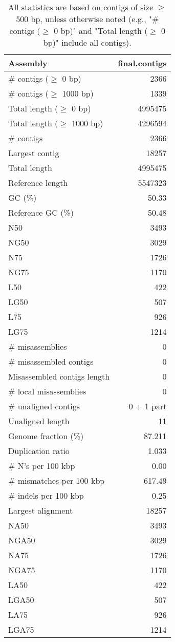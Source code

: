 \documentclass[12pt,a4paper]{article}
\begin{document}
\begin{table}[ht]
\begin{center}
\caption{All statistics are based on contigs of size $\geq$ 500 bp, unless otherwise noted (e.g., "\# contigs ($\geq$ 0 bp)" and "Total length ($\geq$ 0 bp)" include all contigs).}
\begin{tabular}{|l*{1}{|r}|}
\hline
Assembly & final.contigs \\ \hline
\# contigs ($\geq$ 0 bp) & 2366 \\ \hline
\# contigs ($\geq$ 1000 bp) & 1339 \\ \hline
Total length ($\geq$ 0 bp) & 4995475 \\ \hline
Total length ($\geq$ 1000 bp) & 4296594 \\ \hline
\# contigs & 2366 \\ \hline
Largest contig & 18257 \\ \hline
Total length & 4995475 \\ \hline
Reference length & 5547323 \\ \hline
GC (\%) & 50.33 \\ \hline
Reference GC (\%) & 50.48 \\ \hline
N50 & 3493 \\ \hline
NG50 & 3029 \\ \hline
N75 & 1726 \\ \hline
NG75 & 1170 \\ \hline
L50 & 422 \\ \hline
LG50 & 507 \\ \hline
L75 & 926 \\ \hline
LG75 & 1214 \\ \hline
\# misassemblies & 0 \\ \hline
\# misassembled contigs & 0 \\ \hline
Misassembled contigs length & 0 \\ \hline
\# local misassemblies & 0 \\ \hline
\# unaligned contigs & 0 + 1 part \\ \hline
Unaligned length & 11 \\ \hline
Genome fraction (\%) & 87.211 \\ \hline
Duplication ratio & 1.033 \\ \hline
\# N's per 100 kbp & 0.00 \\ \hline
\# mismatches per 100 kbp & 617.49 \\ \hline
\# indels per 100 kbp & 0.25 \\ \hline
Largest alignment & 18257 \\ \hline
NA50 & 3493 \\ \hline
NGA50 & 3029 \\ \hline
NA75 & 1726 \\ \hline
NGA75 & 1170 \\ \hline
LA50 & 422 \\ \hline
LGA50 & 507 \\ \hline
LA75 & 926 \\ \hline
LGA75 & 1214 \\ \hline
\end{tabular}
\end{center}
\end{table}
\end{document}
